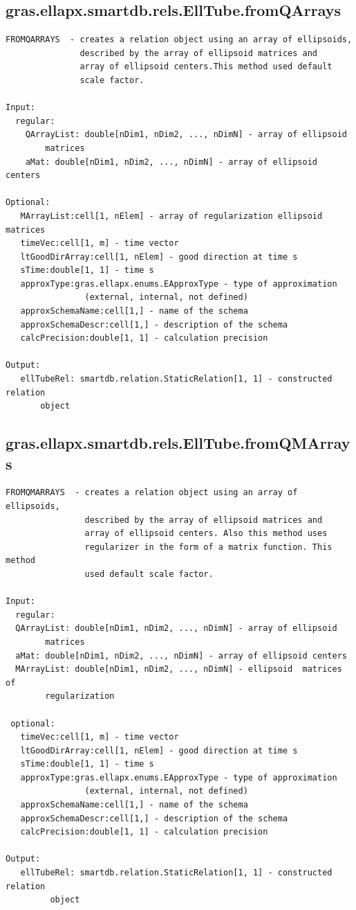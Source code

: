 \documentclass[letterpaper,10pt,english]{sphinxmanual}
\begin{document}
\subsection{gras.ellapx.smartdb.rels.EllTube.fromQArrays}
\label{chap_functions:gras-ellapx-smartdb-rels-elltube-fromqarrays}
\begin{Verbatim}[commandchars=\\\{\}]
FROMQARRAYS  - creates a relation object using an array of ellipsoids,
               described by the array of ellipsoid matrices and
               array of ellipsoid centers.This method used default
               scale factor.

Input:
  regular:
    QArrayList: double[nDim1, nDim2, ..., nDimN] - array of ellipsoid
        matrices
    aMat: double[nDim1, nDim2, ..., nDimN] - array of ellipsoid centers

Optional:
   MArrayList:cell[1, nElem] - array of regularization ellipsoid matrices
   timeVec:cell[1, m] - time vector
   ltGoodDirArray:cell[1, nElem] - good direction at time s
   sTime:double[1, 1] - time s
   approxType:gras.ellapx.enums.EApproxType - type of approximation
                (external, internal, not defined)
   approxSchemaName:cell[1,] - name of the schema
   approxSchemaDescr:cell[1,] - description of the schema
   calcPrecision:double[1, 1] - calculation precision

Output:
   ellTubeRel: smartdb.relation.StaticRelation[1, 1] - constructed relation
       object
\end{Verbatim}


\subsection{gras.ellapx.smartdb.rels.EllTube.fromQMArrays}
\label{chap_functions:gras-ellapx-smartdb-rels-elltube-fromqmarrays}
\begin{Verbatim}[commandchars=\\\{\}]
FROMQMARRAYS  - creates a relation object using an array of ellipsoids,
                described by the array of ellipsoid matrices and
                array of ellipsoid centers. Also this method uses
                regularizer in the form of a matrix function. This method
                used default scale factor.

Input:
  regular:
  QArrayList: double[nDim1, nDim2, ..., nDimN] - array of ellipsoid
        matrices
  aMat: double[nDim1, nDim2, ..., nDimN] - array of ellipsoid centers
  MArrayList: double[nDim1, nDim2, ..., nDimN] - ellipsoid  matrices of
        regularization

 optional:
   timeVec:cell[1, m] - time vector
   ltGoodDirArray:cell[1, nElem] - good direction at time s
   sTime:double[1, 1] - time s
   approxType:gras.ellapx.enums.EApproxType - type of approximation
                (external, internal, not defined)
   approxSchemaName:cell[1,] - name of the schema
   approxSchemaDescr:cell[1,] - description of the schema
   calcPrecision:double[1, 1] - calculation precision

Output:
   ellTubeRel: smartdb.relation.StaticRelation[1, 1] - constructed relation
         object
\end{Verbatim}
\end{document}

